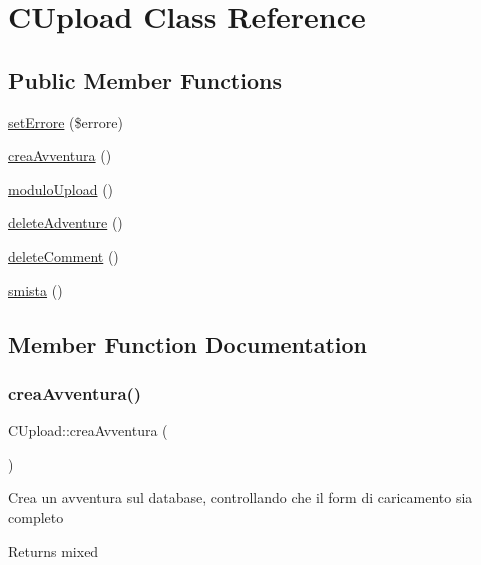\hypertarget{class_c_upload}{}\section{C\+Upload Class Reference}
\label{class_c_upload}
\subsection*{Public Member Functions}
\begin{DoxyCompactItemize}
\item 
\mbox{\hyperlink{class_c_upload_a8cc74e63124f1f9f2a368030597513d2}{set\+Errore}} (\$errore)
\item 
\mbox{\hyperlink{class_c_upload_af9d0c07335a1b24e774be088d4d68427}{crea\+Avventura}} ()
\item 
\mbox{\hyperlink{class_c_upload_aa1b51d44277cde35d64536dcb5f29355}{modulo\+Upload}} ()
\item 
\mbox{\hyperlink{class_c_upload_a05dab7f4e0dc9e6cd956155e07309087}{delete\+Adventure}} ()
\item 
\mbox{\hyperlink{class_c_upload_a2d55728314a2c6651d12ed58219f9212}{delete\+Comment}} ()
\item 
\mbox{\hyperlink{class_c_upload_a914c018af3f410672d19bb5433c28b97}{smista}} ()
\end{DoxyCompactItemize}


\subsection{Member Function Documentation}
\mbox{\label{class_c_upload_af9d0c07335a1b24e774be088d4d68427}} 
\subsubsection{\texorpdfstring{crea\+Avventura()}{creaAvventura()}}
{\footnotesize\ttfamily C\+Upload\+::crea\+Avventura (\begin{DoxyParamCaption}{ }\end{DoxyParamCaption})}

Crea un avventura sul database, controllando che il form di caricamento sia completo

\begin{DoxyReturn}{Returns}
mixed 
\end{DoxyReturn}
\mbox{\label{class_c_upload_a05dab7f4e0dc9e6cd956155e07309087}} 
